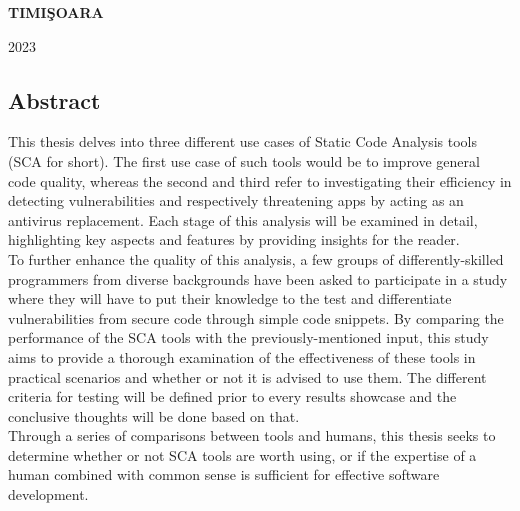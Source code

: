 \documentclass[12pt,a4paper,openany]{book}
\theoremstyle{definition}
\theoremstyle{remark}
\begin{document}
\vfill
\begin{center}
{\bf TIMI\c SOARA

2023}
\end{center}

\newpage
\normalsize{}
\vspace*{\fill}
\vspace{-2cm}
\begin{center}
\section*{Abstract}
\vspace{50pt}
\end{center}


\noindent This thesis delves into three different use cases of Static Code Analysis tools (SCA for short). The first use case of such tools would be to improve general code quality, whereas the second and third refer to investigating their efficiency in detecting vulnerabilities and respectively threatening apps by acting as an antivirus replacement. Each stage of this analysis will be examined in detail, highlighting key aspects and features by providing insights for the reader.\\

\noindent To further enhance the quality of this analysis, a few groups of differently-skilled programmers from diverse backgrounds have been asked to participate in a study where they will have to put their knowledge to the test and differentiate vulnerabilities from secure code through simple code snippets. By comparing the performance of the SCA tools with the previously-mentioned input, this study aims to provide a thorough examination of the effectiveness of these tools in practical scenarios and whether or not it is advised to use them. The different criteria for testing will be defined prior to every results showcase and the conclusive thoughts will be done based on that. \\

\noindent Through a series of comparisons between tools and humans, this thesis seeks to determine whether or not SCA tools are worth using, or if the expertise of a human combined with common sense is sufficient for effective software development. 

\vspace*{\fill}

\newpage
\normalsize{}

\tableofcontents

\end{document}
